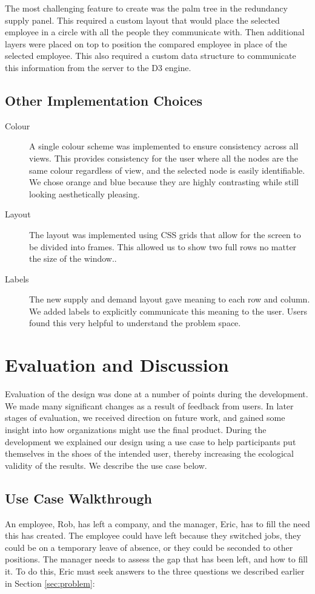 \documentclass[journal]{vgtc}                %
\begin{document}
The most challenging feature to create was the palm tree in the redundancy supply panel.  This required a custom layout that would place the selected employee in a circle with all the people they communicate with.  Then additional layers were placed on top to position the compared employee in place of the selected employee.  This also required a custom data structure to communicate this information from the server to the D3 engine.

\subsection{Other Implementation Choices}

\begin{description}
\item [Colour] A single colour scheme was implemented to ensure consistency across all views.  This provides consistency for the user where all the nodes are the same colour regardless of view, and the selected node is easily identifiable. We chose orange and blue because they are highly contrasting while still looking aesthetically pleasing.
\item[Layout] The layout was implemented using CSS grids that allow for the screen to be divided into frames.  This allowed us to show two full rows no matter the size of the window..
\item[Labels] The new supply and demand layout gave meaning to each row and column. We added labels to explicitly communicate this meaning to the user.  Users found this very helpful to understand the problem space.
\end{description}

\section{Evaluation and Discussion}
\label{sec:evaldiscuss}

Evaluation of the design was done at a number of points during the development. We made many significant changes as a result of feedback from users. In later stages of evaluation, we received direction on future work, and gained some insight into how organizations might use the final product.  During the development we explained our design using a use case to help participants put themselves in the shoes of the intended user, thereby increasing the ecological validity of the results. We describe the use case below. 

\subsection{Use Case Walkthrough}
An employee, Rob, has left a company, and the manager, Eric, has to fill the need this has created. The employee could have left because they switched jobs, they could be on a temporary leave of absence, or they could be seconded to other positions. The manager needs to assess the gap that has been left, and how to fill it. To do this, Eric must seek answers to the three questions we described earlier in Section \ref{sec:problem}:
\end{document}
